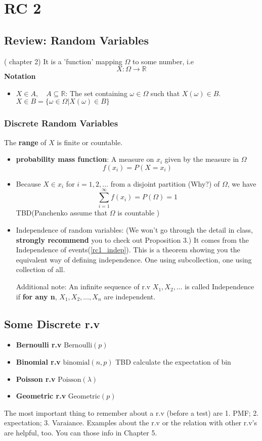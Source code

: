 \chapter{RC 2}

\section{Review: Random Variables}
(\cite{Und_Chatterjee} chapter 2) 
It is a 'function' mapping $\Omega$ to some number, i.e
\[
    X : \Omega \to \mathbb{R}
\]
\textbf{Notation}  
\begin{itemize}
    \item \(X \in A,\quad A \subseteq \mathbb{R}\): The set containing  \(\omega \in \Omega \) such that \(X(\omega ) \in B\). \(X \in B  = \{\omega  \in \Omega | X(\omega ) \in B \}\) 
\end{itemize}
\subsection{Discrete Random Variables}
The \textbf{range} of \(X\) is finite or countable. 
\begin{itemize}
    \item \textbf{probability mass function}: A measure on \(x_i\) given by the measure in \(\Omega \)
    \[
        f(x_i) = P(X = x_i)
    \] 
    \item Because \(X \in x_i\) for \(i = 1,2,\dots\) from a disjoint partition (Why?) of \(\Omega \), we have 
    \[
        \sum_{i=1}^{\infty} f(x_i) = P(\Omega ) = 1
    \]
    TBD(Panchenko assume that \(\Omega \) is countable )    
    \item Independence of random variables: 
    (We won't go through the detail in class, \textbf{strongly recommend} you to check out \cite{Und_Chatterjee} Proposition 3.) 
    It comes from the Independence of events(\ref{rc1_indep}). This is a theorem showing you the equivalent way of defining independence. 
    One using subcollection, one using collection of all. 
    
    Additional note: An infinite sequence of r.v \(X_1, X_2 , \dots\) is called Independence if \textbf{for any n}, \(X_1, X_2, \dots, X_n\) are independent.   
\end{itemize}
\section{Some Discrete r.v}
\begin{itemize}
    \item \textbf{Bernoulli r.v} \(\text{Bernoulli}(p) \)  
    \item \textbf{Binomial r.v} \(\text{binomial}(n,p) \)   
    TBD calculate the expectation of bin
    \item \textbf{Poisson r.v} \(\text{Poisson}(\lambda )\)    
    \item \textbf{Geometric r.v} \(\text{Geometric}(p) \)  
\end{itemize}
The most important thing to remember about a r.v (before a test) are 1. PMF; 2. expectation; 3. Varaiance. Examples about the r.v or the relation with other r.v's are helpful, too. You can those info in \cite{Gravner2021} Chapter 5.

